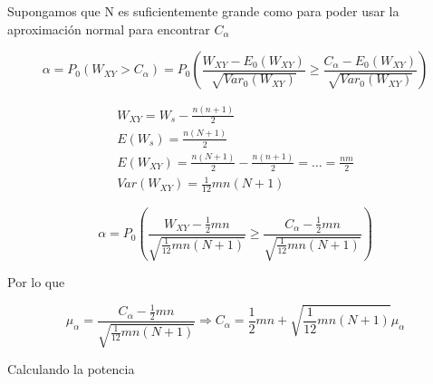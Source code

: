 Supongamos que N es suficientemente grande como para poder usar la aproximación normal para encontrar $C_\alpha$

$$
\alpha = P_0(W_{XY}>C_\alpha)=P_0\left(\frac{W_{XY}-E_0(W_{XY})}{\sqrt{Var_0(W_{XY})}}\geq \frac{C_\alpha-E_0(W_{XY})}{\sqrt{Var_0(W_{XY})}}\right)
$$

$$
\begin{array}{c}
    W_{XY}=W_s-\frac{n(n+1)}{2}\\
    E(W_s)=\frac{n(N+1)}{2}\\
    E(W_{XY})=\frac{n(N+1)}{2}-\frac{n(n+1)}{2}=\dots=\frac{nm}{2}\\
    Var(W_{XY})=\frac{1}{12}mn(N+1)
\end{array}
$$

$$
\alpha=P_0\left(\frac{W_{XY}-\frac{1}{2}mn}{\sqrt{\frac{1}{12}mn(N+1)}}\geq \frac{C_\alpha-\frac{1}{2}mn}{\sqrt{\frac{1}{12}mn(N+1)}}\right)
$$

Por lo que 

$$
\mu_\alpha=\frac{C_\alpha-\frac{1}{2}mn}{\sqrt{\frac{1}{12}mn(N+1)}} \Longrightarrow C_\alpha=\frac{1}{2}mn+\sqrt{\frac{1}{12}mn(N+1)}\mu_\alpha
$$

Calculando la potencia